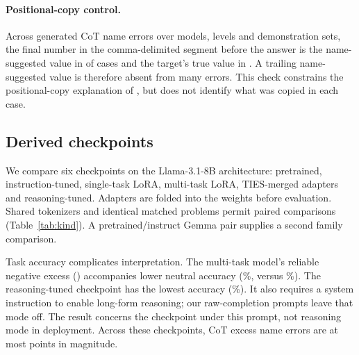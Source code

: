\paragraph{Positional-copy control.} Across  generated CoT name errors over
models, levels and demonstration sets, the final number in the comma-delimited segment before the answer is the
name-suggested value in  of cases and the target's true value in .
A trailing name-suggested value is therefore absent from many errors. This check constrains the positional-copy
explanation of \citet{liu2026readout}, but does not identify what was copied in each case.

\subsection{Derived checkpoints}

\label{app:kind}

We compare six checkpoints on the Llama-3.1-8B architecture: pretrained, instruction-tuned,
single-task LoRA, multi-task LoRA, TIES-merged adapters and reasoning-tuned. Adapters are folded
into the weights before evaluation. Shared tokenizers and identical matched problems permit
paired comparisons (Table~\ref{tab:kind}). A pretrained/instruct Gemma pair supplies a second
family comparison.

\begin{table}[t]
\centering\small
{}
\ifdim\wd\appendixtablebox>\textwidth
\resizebox{\textwidth}{!}{\usebox{\appendixtablebox}}
\else\usebox{\appendixtablebox}\fi
\caption{Level 3, no CoT, name errors above the matched twin's rate, mean over three
demonstration sets. \emph{Acc.} is neutral accuracy. $^{*}$ as in Table~\ref{tab:behavior}.
The bottom block repeats the pretrained-to-instruct step in a second family, Gemma-3-4B.}
\label{tab:kind}
\end{table}

Task accuracy complicates interpretation. The multi-task model's reliable negative excess
() accompanies lower neutral accuracy (\%, versus
\%). The reasoning-tuned checkpoint has the lowest accuracy
(\%). It also requires a system instruction to enable long-form reasoning;
our raw-completion prompts leave that mode off. The result concerns the checkpoint under this
prompt, not reasoning mode in deployment.
Across these checkpoints, CoT excess name errors are at most  points
in magnitude.

